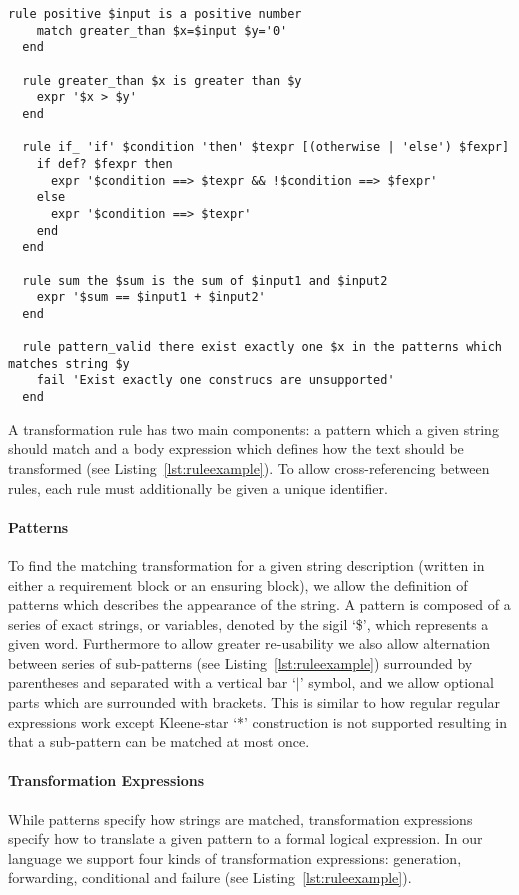 \begin{lstlisting}[caption={Different Types of Transformation Rules in Lettuce},label={lst:ruleexample}]
  rule positive $input is a positive number
    match greater_than $x=$input $y='0'
  end

  rule greater_than $x is greater than $y
    expr '$x > $y'
  end

  rule if_ 'if' $condition 'then' $texpr [(otherwise | 'else') $fexpr]
    if def? $fexpr then
      expr '$condition ==> $texpr && !$condition ==> $fexpr'
    else
      expr '$condition ==> $texpr'
    end
  end

  rule sum the $sum is the sum of $input1 and $input2
    expr '$sum == $input1 + $input2'
  end

  rule pattern_valid there exist exactly one $x in the patterns which matches string $y
    fail 'Exist exactly one construcs are unsupported'
  end
\end{lstlisting}

A transformation rule has two main components: a pattern which a given
string should match and a body expression which defines how the
text should be transformed (see Listing~\ref{lst:ruleexample}).
To allow cross-referencing between rules, each rule must additionally be
given a unique identifier.

\paragraph{Patterns}
\label{par:Patterns}

To find the matching transformation for a given string description
(written in either a requirement block or an ensuring block), we allow the
definition of patterns which describes the appearance of the string.
A pattern is composed of a series of exact strings, or variables,
denoted by the sigil `\$', which represents a given word.
Furthermore to allow greater re-usability we also allow alternation between
series of sub-patterns (see Listing~\ref{lst:ruleexample}) surrounded by parentheses and
separated with a vertical bar `$\vert$' symbol, and we allow optional parts which are
surrounded with brackets.  This is similar to how regular regular
expressions work except Kleene-star `*' construction is not supported
resulting in that a sub-pattern can be matched at most once.

\paragraph{Transformation Expressions}
\label{par:Transformation Expressions}
While patterns specify how strings are matched, transformation expressions
specify how to translate a given pattern to a formal logical expression.
In our language we support four kinds of transformation expressions:
generation, forwarding, conditional and failure (see Listing~\ref{lst:ruleexample}).

